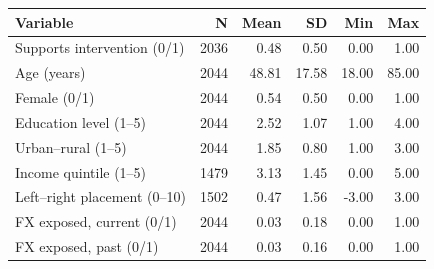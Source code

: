 \begin{tabular}{lrrrrr}
\toprule
Variable & N & Mean & SD & Min & Max \\
\midrule
Supports intervention (0/1) & 2036 & 0.48 & 0.50 & 0.00 & 1.00 \\
Age (years) & 2044 & 48.81 & 17.58 & 18.00 & 85.00 \\
Female (0/1) & 2044 & 0.54 & 0.50 & 0.00 & 1.00 \\
Education level (1--5) & 2044 & 2.52 & 1.07 & 1.00 & 4.00 \\
Urban--rural (1--5) & 2044 & 1.85 & 0.80 & 1.00 & 3.00 \\
Income quintile (1--5) & 1479 & 3.13 & 1.45 & 0.00 & 5.00 \\
Left--right placement (0--10) & 1502 & 0.47 & 1.56 & -3.00 & 3.00 \\
FX exposed, current (0/1) & 2044 & 0.03 & 0.18 & 0.00 & 1.00 \\
FX exposed, past (0/1) & 2044 & 0.03 & 0.16 & 0.00 & 1.00 \\
\bottomrule
\end{tabular}

